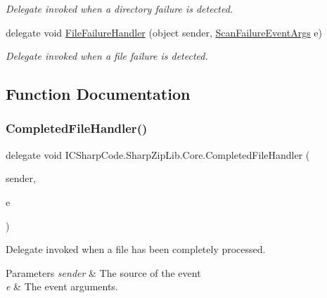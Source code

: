 \begin{DoxyCompactItemize}
\begin{DoxyCompactList}\small\item\em Delegate invoked when a directory failure is detected. \end{DoxyCompactList}\item 
delegate void \hyperlink{namespace_i_c_sharp_code_1_1_sharp_zip_lib_1_1_core_a956b875da234d5808c4151b3ac822f80}{File\+Failure\+Handler} (object sender, \hyperlink{class_i_c_sharp_code_1_1_sharp_zip_lib_1_1_core_1_1_scan_failure_event_args}{Scan\+Failure\+Event\+Args} e)
\begin{DoxyCompactList}\small\item\em Delegate invoked when a file failure is detected. \end{DoxyCompactList}\end{DoxyCompactItemize}


\subsection{Function Documentation}
\mbox{\label{namespace_i_c_sharp_code_1_1_sharp_zip_lib_1_1_core_aecab27a02c97037c68a78142fbbdc069}} 
\subsubsection{\texorpdfstring{Completed\+File\+Handler()}{CompletedFileHandler()}}
{\footnotesize\ttfamily delegate void I\+C\+Sharp\+Code.\+Sharp\+Zip\+Lib.\+Core.\+Completed\+File\+Handler (\begin{DoxyParamCaption}\item[{object}]{sender,  }\item[{\hyperlink{class_i_c_sharp_code_1_1_sharp_zip_lib_1_1_core_1_1_scan_event_args}{Scan\+Event\+Args}}]{e }\end{DoxyParamCaption})}



Delegate invoked when a file has been completely processed. 


\begin{DoxyParams}{Parameters}
{\em sender} & The source of the event\\
\hline
{\em e} & The event arguments.\\
\hline
\end{DoxyParams}
\mbox{\label{namespace_i_c_sharp_code_1_1_sharp_zip_lib_1_1_core_a59ce8afe31b0ed5684e54008b1c8dd33}} 
